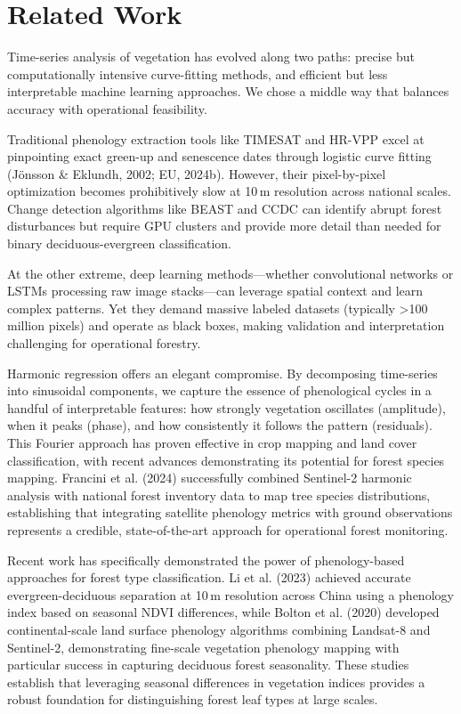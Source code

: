 \documentclass[utf8]{FrontiersinHarvard}
\begin{document}
\section{Related Work}

Time-series analysis of vegetation has evolved along two paths: precise but computationally intensive curve-fitting methods, and efficient but less interpretable machine learning approaches. We chose a middle way that balances accuracy with operational feasibility.

Traditional phenology extraction tools like TIMESAT and HR-VPP excel at pinpointing exact green-up and senescence dates through logistic curve fitting (Jönsson \& Eklundh, 2002; EU, 2024b). However, their pixel-by-pixel optimization becomes prohibitively slow at 10\,m resolution across national scales. Change detection algorithms like BEAST and CCDC can identify abrupt forest disturbances but require GPU clusters and provide more detail than needed for binary deciduous-evergreen classification.

At the other extreme, deep learning methods—whether convolutional networks or LSTMs processing raw image stacks—can leverage spatial context and learn complex patterns. Yet they demand massive labeled datasets (typically >100 million pixels) and operate as black boxes, making validation and interpretation challenging for operational forestry.

Harmonic regression offers an elegant compromise. By decomposing time-series into sinusoidal components, we capture the essence of phenological cycles in a handful of interpretable features: how strongly vegetation oscillates (amplitude), when it peaks (phase), and how consistently it follows the pattern (residuals). This Fourier approach has proven effective in crop mapping and land cover classification, with recent advances demonstrating its potential for forest species mapping. Francini et al. (2024) successfully combined Sentinel-2 harmonic analysis with national forest inventory data to map tree species distributions, establishing that integrating satellite phenology metrics with ground observations represents a credible, state-of-the-art approach for operational forest monitoring.

Recent work has specifically demonstrated the power of phenology-based approaches for forest type classification. Li et al. (2023) achieved accurate evergreen-deciduous separation at 10\,m resolution across China using a phenology index based on seasonal NDVI differences, while Bolton et al. (2020) developed continental-scale land surface phenology algorithms combining Landsat-8 and Sentinel-2, demonstrating fine-scale vegetation phenology mapping with particular success in capturing deciduous forest seasonality. These studies establish that leveraging seasonal differences in vegetation indices provides a robust foundation for distinguishing forest leaf types at large scales.
\end{document}
